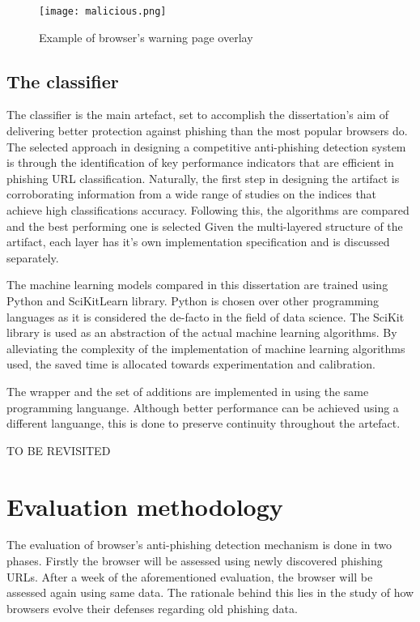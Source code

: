 \begin{figure}
	\centering
	\texttt{[image: malicious.png]}
	\caption{Example of browser's warning page overlay}
	\label{fig:PHISHING_PREVENTED}
\end{figure}

\subsection{The classifier}
The classifier is the main artefact, set to accomplish the dissertation's aim of delivering better protection against phishing than the most popular browsers do. The selected approach in designing a competitive anti-phishing detection system is through the identification of key performance indicators that are efficient in phishing URL classification. Naturally, the first step in designing the artifact is corroborating information from a wide range of studies on the indices that achieve high classifications accuracy. Following this, the algorithms are compared and the best performing one is selected
Given the multi-layered structure of the artifact, each layer has it's own implementation specification and is discussed separately.

The machine learning models compared in this dissertation are trained using Python and SciKitLearn library. Python is chosen over other programming languages as it is considered the de-facto in the field of data science. The SciKit library is used as an abstraction of the actual machine learning algorithms. By alleviating the complexity of the implementation of machine learning algorithms used, the saved time is allocated towards experimentation and calibration.

The wrapper and the set of additions are implemented in using the same programming languange. Although better performance can be achieved using a different languange, this is done to preserve continuity throughout the artefact.

TO BE REVISITED

\section{Evaluation methodology}
The evaluation of browser's anti-phishing detection mechanism is done in two phases. Firstly the browser will be assessed using newly discovered phishing URLs. After a week of the aforementioned evaluation, the browser will be assessed again using same data. The rationale behind this lies in the study of how browsers evolve their defenses regarding old phishing data.

